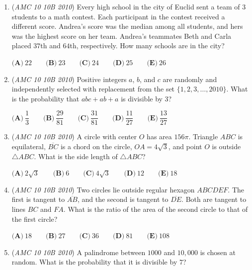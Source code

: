 \begin{enumerate}
 $\textbf{(A)}\ \dfrac{\pi}{3}-1 \qquad \textbf{(B)}\ \dfrac{2\pi}{9}-\dfrac{\sqrt{3}}{3} \qquad \textbf{(C)}\ \dfrac{\pi}{18} \qquad \textbf{(D)}\ \dfrac{1}{4} \qquad \textbf{(E)}\ \dfrac{2\pi}{9}$


	\item (\textit{AMC 10 10B 2010}) Every high school in the city of Euclid sent a team of $3$ students to a math contest. Each participant in the contest received a different score. Andrea's score was the median among all students, and hers was the highest score on her team. Andrea's teammates Beth and Carla placed $37$th and $64$th, respectively. How many schools are in the city?


 $\textbf{(A)}\ 22 \qquad \textbf{(B)}\ 23 \qquad \textbf{(C)}\ 24 \qquad \textbf{(D)}\ 25 \qquad \textbf{(E)}\ 26$


	\item (\textit{AMC 10 10B 2010}) Positive integers $a$, $b$, and $c$ are randomly and independently selected with replacement from the set $\{1, 2, 3,\dots, 2010\}$. What is the probability that $abc + ab + a$ is divisible by $3$?


 $\textbf{(A)}\ \dfrac{1}{3} \qquad \textbf{(B)}\ \dfrac{29}{81} \qquad \textbf{(C)}\ \dfrac{31}{81} \qquad \textbf{(D)}\ \dfrac{11}{27} \qquad \textbf{(E)}\ \dfrac{13}{27}$


	\item (\textit{AMC 10 10B 2010}) A circle with center $O$ has area $156\pi$. Triangle $ABC$ is equilateral, $\overline{BC}$ is a chord on the circle, $OA = 4\sqrt{3}$, and point $O$ is outside $\triangle ABC$. What is the side length of $\triangle ABC$?


 $\textbf{(A)}\ 2\sqrt{3} \qquad \textbf{(B)}\ 6 \qquad \textbf{(C)}\ 4\sqrt{3} \qquad \textbf{(D)}\ 12 \qquad \textbf{(E)}\ 18$


	\item (\textit{AMC 10 10B 2010}) Two circles lie outside regular hexagon $ABCDEF$. The first is tangent to $\overline{AB}$, and the second is tangent to $\overline{DE}$. Both are tangent to lines $BC$ and $FA$. What is the ratio of the area of the second circle to that of the first circle?


 $\textbf{(A)}\ 18 \qquad \textbf{(B)}\ 27 \qquad \textbf{(C)}\ 36 \qquad \textbf{(D)}\ 81 \qquad \textbf{(E)}\ 108$


	\item (\textit{AMC 10 10B 2010}) A palindrome between $1000$ and $10,000$ is chosen at random. What is the probability that it is divisible by $7$?



\end{enumerate}

